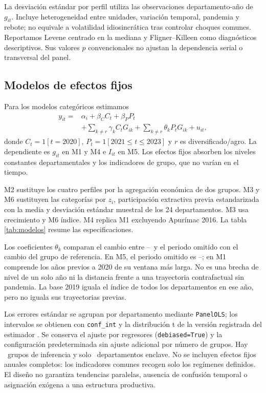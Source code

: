 La desviación estándar por perfil utiliza las observaciones departamento-año de $g_{it}$. Incluye heterogeneidad entre unidades, variación temporal, pandemia y rebote; no equivale a volatilidad idiosincrática tras controlar choques comunes. Reportamos Levene centrado en la mediana y Fligner--Killeen como diagnósticos descriptivos. Sus valores $p$ convencionales no ajustan la dependencia serial o transversal del panel.

\subsection{Modelos de efectos fijos}
Para los modelos categóricos estimamos
\begin{equation}\begin{split}
y_{it}={}&\alpha_i+\beta_C C_t+\beta_P P_t\\
&+\sum_{k\ne r}\gamma_k C_tG_{ik}+\sum_{k\ne r}\theta_k P_tG_{ik}+u_{it},
\end{split}\end{equation}
donde $C_t=1[t=2020]$, $P_t=1[2021\leq t\leq2023]$ y $r$ es diversificado/agro. La dependiente es $g_{it}$ en M1 y M4 e $I_{it}$ en M5. Los efectos fijos absorben los niveles constantes departamentales y los indicadores de grupo, que no varían en el tiempo.

M2 sustituye los cuatro perfiles por la agregación económica de dos grupos. M3 y M6 sustituyen las categorías por $z_i$, participación extractiva previa estandarizada con la media y desviación estándar muestral de los 24 departamentos. M3 usa crecimiento y M6 índice. M4 replica M1 excluyendo Apurímac 2016. La tabla \ref{tab:modelos} resume las especificaciones.

\begin{table}[htbp]\centering\small
\caption{Especificaciones y muestras}\label{tab:modelos}
\end{table}

Los coeficientes $\theta_k$ comparan el cambio entre \PostStart--\PostEnd\ y el periodo omitido con el cambio del grupo de referencia. En M5, el periodo omitido es \LevelStart--\PreEnd; en M1 comprende los años previos a 2020 de su ventana más larga. No es una brecha de nivel de un solo año ni la distancia frente a una trayectoria contrafactual sin pandemia. La base 2019 iguala el índice de todos los departamentos en ese año, pero no iguala sus trayectorias previas.

Los errores estándar se agrupan por departamento mediante \texttt{PanelOLS}; los intervalos se obtienen con \texttt{conf\_int} y la distribución t de la versión registrada del estimador \cite{linearmodels}. Se conserva el ajuste por regresores (\texttt{debiased=True}) y la configuración predeterminada sin ajuste adicional por número de grupos. Hay \Departments\ grupos de inferencia y solo \EnclaveCount\ departamentos enclave. No se incluyen efectos fijos anuales completos: los indicadores comunes recogen solo los regímenes definidos. El diseño no garantiza tendencias paralelas, ausencia de confusión temporal o asignación exógena a una estructura productiva.
\FloatBarrier
